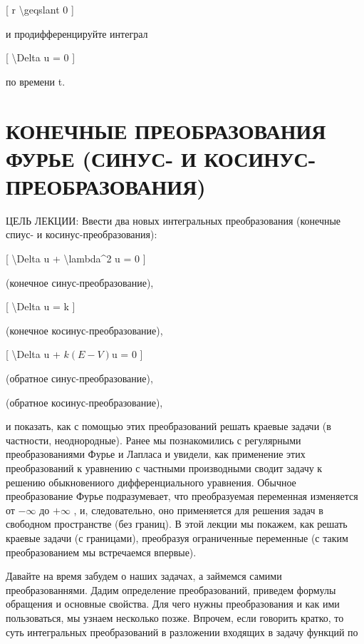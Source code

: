 \documentclass[
]{article}
\begin{document}
{{{[} r \textbackslash geqslant 0 {]}

и продифференцируйте интеграл

{[} \textbackslash Delta u = 0 {]}

по времени t.

\section{КОНЕЧНЫЕ ПРЕОБРАЗОВАНИЯ ФУРЬЕ (СИНУС- И
КОСИНУС-ПРЕОБРАЗОВАНИЯ)}\label{ux43aux43eux43dux435ux447ux43dux44bux435-ux43fux440ux435ux43eux431ux440ux430ux437ux43eux432ux430ux43dux438ux44f-ux444ux443ux440ux44cux435-ux441ux438ux43dux443ux441--ux438-ux43aux43eux441ux438ux43dux443ux441-ux43fux440ux435ux43eux431ux440ux430ux437ux43eux432ux430ux43dux438ux44f}

ЦЕЛЬ ЛЕКЦИИ: Ввести два новых интегральных преобразования (конечные
спиус- и косинус-преобразования):

{[} \textbackslash Delta u + \textbackslash lambda\^{}2 u = 0 {]}

(конечное синус-преобразование),

{[} \textbackslash Delta u = k {]}

(конечное косинус-преобразование),

{[} \textbackslash Delta u + \(k(E - V)\)u = 0 {]}

(обратное синус-преобразование),

(обратное косинус-преобразование),

и показать, как с помощью этих преобразований решать краевые задачи (в
частности, неоднородные). Ранее мы познакомились с регулярными
преобразованиями Фурье и Лапласа и увидели, как применение этих
преобразований к уравнению с частными производными сводит задачу к
решению обыкновениого дифференциального уравнения. Обычное
преобразование Фурье подразумевает, что преобразуемая переменная
изменяется от \(-\infty\) до \(+\infty\) , и, следовательно, оно
применяется для решения задач в свободном пространстве (без границ). В
этой лекции мы покажем, как решать краевые задачи (с границами),
преобразуя ограниченные переменные (с таким преобразованием мы
встречаемся впервые).

Давайте на время забудем о наших задачах, а займемся самими
преобразованнями. Дадим определение преобразований, приведем формулы
обращения и основные свойства. Для чего нужны преобразования и как ими
пользоваться, мы узнаем несколько позже. Впрочем, если говорить кратко,
то суть интегральных преобразований в разложении входящих в задачу
функций по

}}
\end{document}
